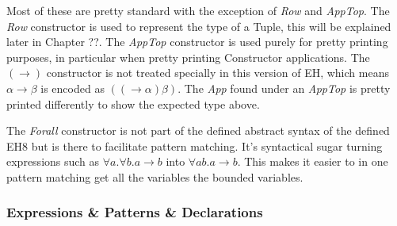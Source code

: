 Most of these are pretty standard with the exception of \emph{Row} and \emph{AppTop}. The \emph{Row} constructor is used to represent the type of a Tuple, this will be explained later in Chapter ??. 
The \emph{AppTop} constructor is used purely for pretty printing purposes, in particular when pretty printing Constructor applications. The $(\rightarrow)$ constructor is not treated specially in this version of EH, which means $\alpha \rightarrow \beta$ is encoded as $((\rightarrow \alpha) \beta)$. The \emph{App} found under an \emph{AppTop} is pretty printed differently to show the expected type above.

The \emph{Forall} constructor is not part of the defined abstract syntax of the defined EH8 but is there to facilitate pattern matching. It's syntactical sugar turning expressions such as $\forall a. \forall b. a \rightarrow b$ into $\forall a b. a \rightarrow b$. This makes it easier to in one pattern matching get all the variables the bounded variables.

\subsubsection{Expressions \& Patterns \& Declarations}

